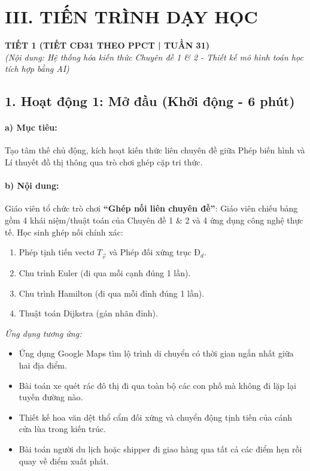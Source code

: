 \documentclass[12pt, a4paper]{article}
\renewcommand{\vec}[1]{\overrightarrow{#1}}
\begin{document}
\section*{III. TIẾN TRÌNH DẠY HỌC}

\begin{center}
    \textbf{\large TIẾT 1 (TIẾT CĐ31 THEO PPCT | TUẦN 31)}\\[4pt]
    \textit{(Nội dung: Hệ thống hóa kiến thức Chuyên đề 1 \& 2 - Thiết kế mô hình toán học tích hợp bằng AI)}
\end{center}

\subsection*{1. Hoạt động 1: Mở đầu (Khởi động - 6 phút)}

\paragraph{a) Mục tiêu:} Tạo tâm thế chủ động, kích hoạt kiến thức liên chuyên đề giữa Phép biến hình và Lí thuyết đồ thị thông qua trò chơi ghép cặp tri thức.

\paragraph{b) Nội dung:} Giáo viên tổ chức trò chơi \textbf{``Ghép nối liên chuyên đề''}: Giáo viên chiếu bảng gồm 4 khái niệm/thuật toán của Chuyên đề 1 & 2 và 4 ứng dụng công nghệ thực tế. Học sinh ghép nối chính xác:
\begin{enumerate}[leftmargin=0.6cm]
    \item Phép tịnh tiến vectơ $T_{\vec{v}}$ và Phép đối xứng trục $Đ_d$.
    \item Chu trình Euler (đi qua mỗi cạnh đúng 1 lần).
    \item Chu trình Hamilton (đi qua mỗi đỉnh đúng 1 lần).
    \item Thuật toán Dijkstra (gán nhãn đỉnh).
\end{enumerate}
\textit{Ứng dụng tương ứng:}
\begin{itemize}[leftmargin=0.5cm]
    \item[A.] Ứng dụng Google Maps tìm lộ trình di chuyển có thời gian ngắn nhất giữa hai địa điểm.
    \item[B.] Bài toán xe quét rác đô thị đi qua toàn bộ các con phố mà không đi lặp lại tuyến đường nào.
    \item[C.] Thiết kế hoa văn dệt thổ cẩm đối xứng và chuyển động tịnh tiến của cánh cửa lùa trong kiến trúc.
    \item[D.] Bài toán người du lịch hoặc shipper đi giao hàng qua tất cả các điểm hẹn rồi quay về điểm xuất phát.
\end{itemize}
\end{document}
